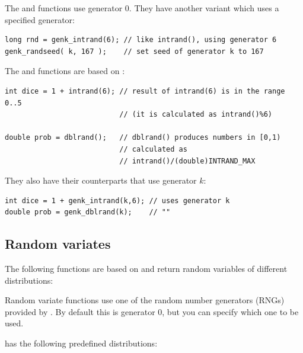 The  and  functions use generator 0. They have
another variant which uses a specified generator:

\begin{verbatim}
long rnd = genk_intrand(6); // like intrand(), using generator 6
genk_randseed( k, 167 );    // set seed of generator k to 167
\end{verbatim}


The  and  functions are based on :

\begin{verbatim}
int dice = 1 + intrand(6); // result of intrand(6) is in the range 0..5
                           // (it is calculated as intrand()%6)

double prob = dblrand();   // dblrand() produces numbers in [0,1)
                           // calculated as
                           // intrand()/(double)INTRAND_MAX
\end{verbatim}


They also have their counterparts that use generator $k$:

\begin{verbatim}
int dice = 1 + genk_intrand(k,6); // uses generator k
double prob = genk_dblrand(k);    // ""
\end{verbatim}




\subsection{Random variates}

The following functions are based on  and return
random variables of different distributions:

Random variate functions use one of the random number generators (RNGs)
provided by \opp. By default this is generator 0, but you can specify
which one to be used.

{\opp} has the following predefined distributions:

